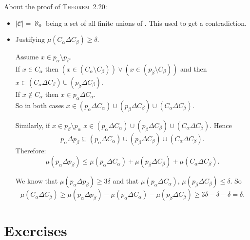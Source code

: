 About the proof of \textsc{Theorem}~2.20:
\begin{itemize}
\item \(|\mathscr{C}|=\aleph_0\) being a set of all finite unions of \scrB.
  This used to get a contradiction.
\item Justifying \(\mu(C_\alpha \Delta C_\beta) \geq \delta\).

  Assume \(x\in p_\alpha \setminus p_\beta\).\\
  If \(x\in C_\alpha\) then 
  \((x \in (C_\alpha \setminus C_\beta))\lor(x\in (p_\beta \setminus C_\beta))\)
  and then \(x\in (C_\alpha \Delta C_\beta) \cup (p_\beta \Delta C_\beta)\).
  \\
  If \(x\notin C_\alpha\) then \(x \in p_\alpha \Delta C_\alpha\).\\
  So in both cases 
    \(x \in (p_\alpha \Delta C_\alpha) \cup (p_\beta \Delta C_\beta) 
      \cup  (C_\alpha \Delta C_\beta)\).

  Similarly, if \(x\in p_\beta \setminus p_\alpha\)
    \(x \in (p_\alpha \Delta C_\alpha) \cup (p_\beta \Delta C_\beta) 
      \cup  (C_\alpha \Delta C_\beta)\). Hence
  \begin{equation*}
    p_\alpha \Delta p_\beta \subseteq
    (p_\alpha \Delta C_\alpha) \cup (p_\beta \Delta C_\beta) 
      \cup  (C_\alpha \Delta C_\beta).
  \end{equation*}
  Therefore:
  \begin{equation*}
    \mu(p_\alpha \Delta p_\beta) \leq
    \mu(p_\alpha \Delta C_\alpha) + \mu(p_\beta \Delta C_\beta) 
      + \mu(C_\alpha \Delta C_\beta).
  \end{equation*}

  We know that \(\mu(p_\alpha \Delta p_\beta) \geq 3\delta\)
  and that 
  \(\mu(p_\alpha \Delta C_\alpha),\,\mu(p_\beta \Delta C_\beta) \leq \delta\).
  So
  \begin{equation*}
  \mu(C_\alpha \Delta C_\beta) \geq
    \mu(p_\alpha \Delta p_\beta)
      - \mu(p_\alpha \Delta C_\alpha) - \mu(p_\beta \Delta C_\beta) 
  \geq 3\delta - \delta - \delta = \delta.
  \end{equation*}


\end{itemize}

\section{Exercises}

